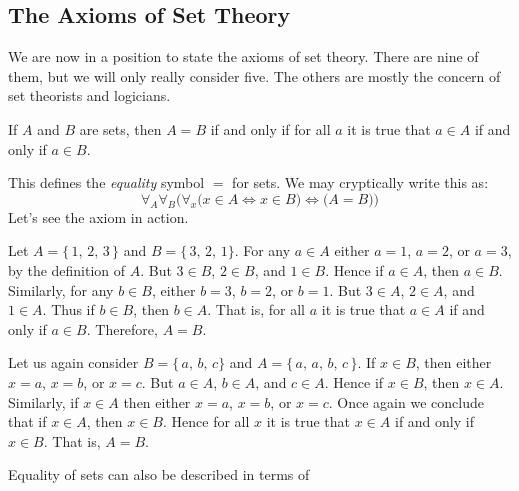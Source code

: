         \subsection{The Axioms of Set Theory}
            We are now in a position to state the axioms of set theory. There
            are nine of them, but we will only really consider five. The
            others are mostly the concern of set theorists and logicians.
            \begin{axiom}
                If $A$ and $B$ are sets, then $A=B$ if and only if for all
                $a$ it is true that $a\in{A}$ if and only if $a\in{B}$.
            \end{axiom}
            This defines the \textit{equality} symbol $=$ for sets. We may
            cryptically write this as:
            \begin{equation}
                \forall_{A}\forall_{B}\Big(
                    \forall_{x}\big(x\in{A}\Leftrightarrow{x}\in{B}\big)
                        \Leftrightarrow\big(A=B)\Big)
            \end{equation}
            Let's see the axiom in action.
            \begin{example}
                Let $A=\{\,1,\,2,\,3\,\}$ and $B=\{\,3,\,2,\,1\}$. For any
                $a\in{A}$ either $a=1$, $a=2$, or $a=3$, by the definition of
                $A$. But $3\in{B}$, $2\in{B}$, and $1\in{B}$. Hence if
                $a\in{A}$, then $a\in{B}$. Similarly, for any $b\in{B}$,
                either $b=3$, $b=2$, or $b=1$. But $3\in{A}$, $2\in{A}$,
                and $1\in{A}$. Thus if $b\in{B}$, then $b\in{A}$. That is, for
                all $a$ it is true that $a\in{A}$ if and only if $a\in{B}$.
                Therefore, $A=B$.
            \end{example}
            \begin{example}
                Let us again consider $B=\{\,a,\,b,\,c\}$ and
                $A=\{\,a,\,a,\,b,\,c\,\}$. If $x\in{B}$, then either
                $x=a$, $x=b$, or $x=c$. But $a\in{A}$, $b\in{A}$, and $c\in{A}$.
                Hence if $x\in{B}$, then $x\in{A}$. Similarly, if $x\in{A}$ then
                either $x=a$, $x=b$, or $x=c$. Once again we conclude that if
                $x\in{A}$, then $x\in{B}$. Hence for all $x$ it is true that
                $x\in{A}$ if and only if $x\in{B}$. That is, $A=B$.
            \end{example}
            Equality of sets can also be described in terms of
